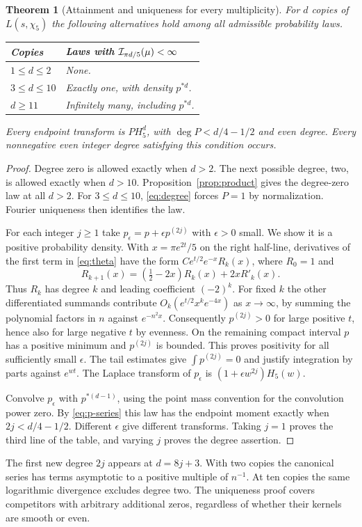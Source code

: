 \documentclass[11pt,letterpaper]{article}
\newtheorem{theorem}{Theorem}[section]
\begin{document}
\begin{theorem}[Attainment and uniqueness for every multiplicity]\label{thm:five}
For $d$ copies of $L(s,\chi_5)$ the following alternatives hold among all admissible probability laws.
\begin{center}
\begin{tabular}{@{}ll@{}}\toprule
Copies & Laws with $\mathcal I_{\pi d/5}(\mu)<\infty$ \\ \midrule
$1\le d\le2$ & None.\\
$3\le d\le10$ & Exactly one, with density $p^{*d}$.\\
$d\ge11$ & Infinitely many, including $p^{*d}$.\\ \bottomrule
\end{tabular}
\end{center}
Every endpoint transform is $P H_5^d$, with $\deg P<d/4-1/2$ and even degree. Every nonnegative even integer degree satisfying this condition occurs.
\end{theorem}
\begin{proof}
Degree zero is allowed exactly when $d>2$. The next possible degree, two, is allowed exactly when $d>10$. Proposition~\ref{prop:product} gives the degree-zero law at all $d>2$. For $3\le d\le10$, \eqref{eq:degree} forces $P=1$ by normalization. Fourier uniqueness then identifies the law.

For each integer $j\ge1$ take $p_\epsilon=p+\epsilon p^{(2j)}$ with $\epsilon>0$ small. We show it is a positive probability density. With $x=\pi e^{2t}/5$ on the right half-line, derivatives of the first term in \eqref{eq:theta} have the form $C e^{t/2}e^{-x}R_k(x)$, where $R_0=1$ and
\[
 R_{k+1}(x)=(\tfrac12-2x)R_k(x)+2xR'_k(x).
\]
Thus $R_k$ has degree $k$ and leading coefficient $(-2)^k$. For fixed $k$ the other differentiated summands contribute $O_k(e^{t/2}x^k e^{-4x})$ as $x\to\infty$, by summing the polynomial factors in $n$ against $e^{-n^2x}$. Consequently $p^{(2j)}>0$ for large positive $t$, hence also for large negative $t$ by evenness. On the remaining compact interval $p$ has a positive minimum and $p^{(2j)}$ is bounded. This proves positivity for all sufficiently small $\epsilon$. The tail estimates give $\int p^{(2j)}=0$ and justify integration by parts against $e^{wt}$. The Laplace transform of $p_\epsilon$ is $(1+\epsilon w^{2j})H_5(w)$.

Convolve $p_\epsilon$ with $p^{*(d-1)}$, using the point mass convention for the convolution power zero. By \eqref{eq:p-series} this law has the endpoint moment exactly when $2j<d/4-1/2$. Different $\epsilon$ give different transforms. Taking $j=1$ proves the third line of the table, and varying $j$ proves the degree assertion.
\end{proof}
The first new degree $2j$ appears at $d=8j+3$. With two copies the canonical series has terms asymptotic to a positive multiple of $n^{-1}$. At ten copies the same logarithmic divergence excludes degree two. The uniqueness proof covers competitors with arbitrary additional zeros, regardless of whether their kernels are smooth or even.
\end{document}
